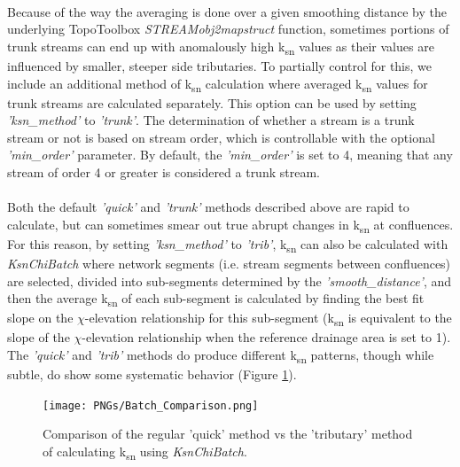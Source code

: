 \paragraph{}Because of the way the averaging is done over a given smoothing distance by the underlying TopoToolbox \textit{STREAMobj2mapstruct} function, sometimes portions of trunk streams can end up with anomalously high k\textsubscript{sn} values as their values are influenced by smaller, steeper side tributaries. To partially control for this, we include an additional method of k\textsubscript{sn} calculation where averaged k\textsubscript{sn} values for trunk streams are calculated separately. This option can be used by setting \textit{'ksn\_method'} to \textit{'trunk'}. The determination of whether a stream is a trunk stream or not is based on stream order, which is controllable with the optional \textit{'min\_order'} parameter. By default, the \textit{'min\_order'} is set to 4, meaning that any stream of order 4 or greater is considered a trunk stream.

\paragraph{}Both the default \textit{'quick'} and \textit{'trunk'} methods described above are rapid to calculate, but can sometimes smear out true abrupt changes in k\textsubscript{sn} at confluences. For this reason, by setting \textit{'ksn\_method'} to \textit{'trib'}, k\textsubscript{sn} can also be calculated with \textit{KsnChiBatch} where network segments (i.e. stream segments between confluences) are selected, divided into sub-segments determined by the \textit{'smooth\_distance'}, and then the average k\textsubscript{sn} of each sub-segment is calculated by finding the best fit slope on the $\chi$-elevation relationship for this sub-segment (k\textsubscript{sn} is equivalent to the slope of the $\chi$-elevation relationship when the reference drainage area is set to 1). The \textit{'quick'} and \textit{'trib'} methods do produce different k\textsubscript{sn} patterns, though while subtle, do show some systematic behavior (Figure \ref{fig:BatchComp}).

\begin{figure}[H]
	\texttt{[image: PNGs/Batch\_Comparison.png]}
	\caption{Comparison of the regular 'quick' method vs the 'tributary' method of calculating k\textsubscript{sn} using \textit{KsnChiBatch}.}
	\label{fig:BatchComp}
\end{figure}

